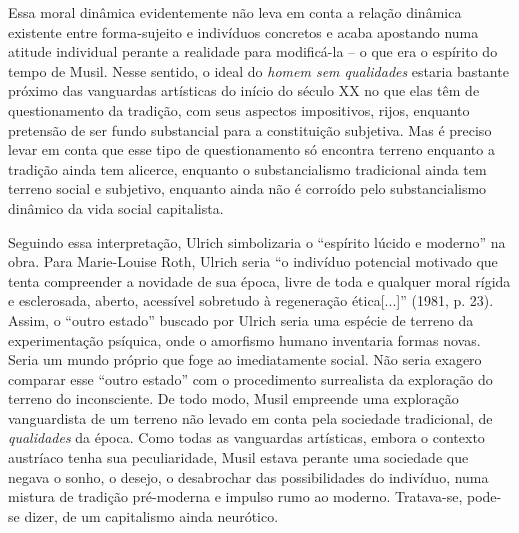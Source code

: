 Essa moral dinâmica evidentemente não leva em conta a relação dinâmica
existente entre forma-sujeito e indivíduos concretos e acaba apostando
numa atitude individual perante a realidade para modificá-la -- o que
era o espírito do tempo de Musil. Nesse sentido, o ideal do \emph{homem
sem qualidades} estaria bastante próximo das vanguardas artísticas do
início do século XX no que elas têm de questionamento da tradição, com
seus aspectos impositivos, rijos, enquanto pretensão de ser fundo
substancial para a constituição subjetiva. Mas é preciso levar em conta
que esse tipo de questionamento só encontra terreno enquanto a tradição
ainda tem alicerce, enquanto o substancialismo tradicional ainda tem
terreno social e subjetivo, enquanto ainda não é corroído pelo
substancialismo dinâmico da vida social capitalista.

Seguindo essa interpretação, Ulrich simbolizaria o ``espírito lúcido e
moderno'' na obra. Para Marie-Louise Roth, Ulrich seria ``o indivíduo
potencial motivado que tenta compreender a novidade de sua época, livre
de toda e qualquer moral rígida e esclerosada, aberto, acessível
sobretudo à regeneração ética{[}...{]}'' (1981, p. 23). Assim, o ``outro
estado'' buscado por Ulrich seria uma espécie de terreno da
experimentação psíquica, onde o amorfismo humano inventaria formas
novas. Seria um mundo próprio que foge ao imediatamente social. Não
seria exagero comparar esse ``outro estado'' com o procedimento
surrealista da exploração do terreno do inconsciente. De todo modo,
Musil empreende uma exploração vanguardista de um terreno não levado em
conta pela sociedade tradicional, de \emph{qualidades} da época. Como
todas as vanguardas artísticas, embora o contexto austríaco tenha sua
peculiaridade, Musil estava perante uma sociedade que negava o sonho, o
desejo, o desabrochar das possibilidades do indivíduo, numa mistura de
tradição pré-moderna e impulso rumo ao moderno. Tratava-se, pode-se
dizer, de um capitalismo ainda neurótico.

